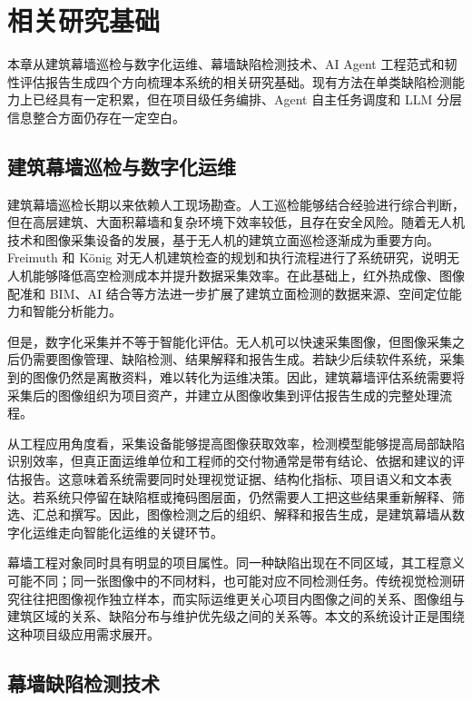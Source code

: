 \chapter{相关研究基础}
\label{chap:foundation}

本章从建筑幕墙巡检与数字化运维、幕墙缺陷检测技术、AI Agent 工程范式和韧性评估报告生成四个方向梳理本系统的相关研究基础。现有方法在单类缺陷检测能力上已经具有一定积累，但在项目级任务编排、Agent 自主任务调度和 LLM 分层信息整合方面仍存在一定空白。

\section{建筑幕墙巡检与数字化运维}
\label{sec:foundation-building-curtain-wall-inspection-and-digital-operation-and-maintenance}

建筑幕墙巡检长期以来依赖人工现场勘查。人工巡检能够结合经验进行综合判断，但在高层建筑、大面积幕墙和复杂环境下效率较低，且存在安全风险。随着无人机技术和图像采集设备的发展，基于无人机的建筑立面巡检逐渐成为重要方向。Freimuth 和 K{\"o}nig 对无人机建筑检查的规划和执行流程进行了系统研究，说明无人机能够降低高空检测成本并提升数据采集效率\cite{freimuth2018uav}。在此基础上，红外热成像、图像配准和 BIM、AI 结合等方法进一步扩展了建筑立面检测的数据来源、空间定位能力和智能分析能力\cite{li2024facade,zhang2023uavbim,leng2018bimai}。

但是，数字化采集并不等于智能化评估。无人机可以快速采集图像，但图像采集之后仍需要图像管理、缺陷检测、结果解释和报告生成。若缺少后续软件系统，采集到的图像仍然是离散资料，难以转化为运维决策。因此，建筑幕墙评估系统需要将采集后的图像组织为项目资产，并建立从图像收集到评估报告生成的完整处理流程。

从工程应用角度看，采集设备能够提高图像获取效率，检测模型能够提高局部缺陷识别效率，但真正面运维单位和工程师的交付物通常是带有结论、依据和建议的评估报告。这意味着系统需要同时处理视觉证据、结构化指标、项目语义和文本表达。若系统只停留在缺陷框或掩码图层面，仍然需要人工把这些结果重新解释、筛选、汇总和撰写。因此，图像检测之后的组织、解释和报告生成，是建筑幕墙从数字化运维走向智能化运维的关键环节。

幕墙工程对象同时具有明显的项目属性。同一种缺陷出现在不同区域，其工程意义可能不同；同一张图像中的不同材料，也可能对应不同检测任务。传统视觉检测研究往往把图像视作独立样本，而实际运维更关心项目内图像之间的关系、图像组与建筑区域的关系、缺陷分布与维护优先级之间的关系等。本文的系统设计正是围绕这种项目级应用需求展开。

\section{幕墙缺陷检测技术}
\label{sec:foundation-curtain-wall-defect-detection-technology}

